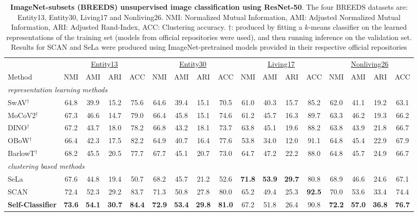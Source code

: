 \documentclass[runningheads]{llncs}
\begin{document}
\begin{table*}[bt]
  \centering
  \tiny
\caption{\textbf{ImageNet-subsets (BREEDS) unsupervised image classification using ResNet-50}. The four BREEDS datasets are: Entity13, Entity30, Living17 and Nonliving26. NMI: Normalized Mutual Information, AMI: Adjusted Normalized Mutual Information, ARI: Adjusted Rand-Index, ACC: Clustering accuracy. ${\dagger}$: produced by fitting a $k$-means classifier on the learned representations of the training set (models from official repositories were used), and then running inference on the validation set. Results for SCAN and SeLa were produced using ImageNet-pretrained models provided in their respective official repositories}
  \label{table:unsupervised_image_classification_breeds}
  \begin{tabular}{lcccc|cccc|cccc|cccc}
    \toprule
     & \multicolumn{4}{c}{\underline{Entity13}} & \multicolumn{4}{c}{\underline{Entity30}} & \multicolumn{4}{c}{\underline{Living17}} & \multicolumn{4}{c}{\underline{Nonliving26}}\\
    Method & NMI & AMI & ARI & ACC & NMI & AMI & ARI & ACC & NMI & AMI & ARI & ACC & NMI & AMI & ARI & ACC \\
    \midrule
    \multicolumn{17}{l}{\textit{representation learning methods}}\\
    SwAV$^{\dagger}$ \cite{caron2020unsupervised} & 64.8 & 39.9 & 15.2 & 75.6 & 64.6 & 39.4 & 15.1 & 70.5 & 61.0 & 40.3 & 15.7 & 85.2 & 62.0 & 41.1 & 19.2 & 63.1 \\
    MoCoV2$^{\dagger}$ \cite{chen2020improved} & 67.3 & 46.6 & 14.7 & 79.0 & 66.4 & 45.8 & 15.1 & 74.6 & 61.2 & 45.7 & 16.3 & 89.7 & 63.3 & 46.2 & 19.3 & 66.2 \\
    DINO$^{\dagger}$ \cite{caron2021emerging} & 67.2 & 43.7 & 18.0 & 78.2 & 66.8 & 43.2 & 18.1 & 73.7 & 63.8 & 45.1 & 19.6 & 88.2 & 63.8 & 43.9 & 21.8 & 66.7 \\
    OBoW$^{\dagger}$ \cite{gidaris2021obow} & 66.4 & 42.3 & 17.5 & 82.2 & 64.9 & 40.7 & 16.4 & 77.6 & 53.8 & 34.0 & 12.0 & 91.1 & 64.8 & 45.4 & 22.9 & 67.9 \\
    BarlowT$^{\dagger}$ \cite{DBLP:conf/icml/ZbontarJMLD21} & 68.2 & 45.5 & 20.5 & 77.7 & 67.7 & 45.1 & 20.7 & 73.0 & 64.7 & 47.2 & 22.2 & 88.0 & 64.8 & 45.7 & 24.9 & 66.7 \\
    \midrule
    \midrule
    \multicolumn{17}{l}{\textit{clustering based methods}}\\
    SeLa \cite{YM.2020Self-labelling} & 67.6 & 44.8 & 19.4 & 50.7 & 68.2 & 45.7 & 21.2 & 52.6 & \textbf{71.8} & \textbf{53.9} & \textbf{29.7} & 80.8 & 68.9 & 46.6 & 24.6 & 67.1 \\
    SCAN \cite{van2020scan} & 72.4 & 52.3 & 29.2 & 83.7 & 71.3 & 50.8 & 27.8 & 80.0 & 65.2 & 49.4 & 25.3 & \textbf{92.5} & 70.0 & 53.6 & 33.4 & 74.4 \\
    \midrule
        \textbf{Self-Classifier} & \textbf{73.6} & \textbf{54.1} & \textbf{30.7} & \textbf{84.4} & \textbf{72.9} & \textbf{53.4} & \textbf{29.8} & \textbf{81.0} & 67.2 & 51.8 & 26.4 & 90.8 & \textbf{72.2} & \textbf{57.0} & \textbf{36.8} & \textbf{76.7} \\
    \bottomrule
  \end{tabular}
\end{table*}
\end{document}
